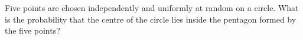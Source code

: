 Five points are chosen independently and uniformly at random on a circle. What is the probability that the centre of the circle lies inside the pentagon formed by the five points?
